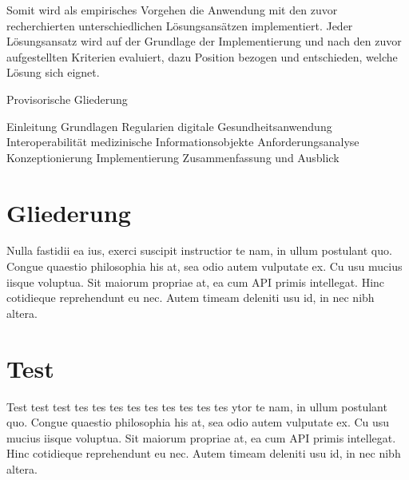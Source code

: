 Somit wird als empirisches Vorgehen die Anwendung mit den zuvor recherchierten unterschiedlichen Lösungsansätzen implementiert. Jeder Lösungsansatz wird auf der Grundlage der Implementierung und nach den zuvor aufgestellten Kriterien evaluiert, dazu Position bezogen und entschieden, welche Lösung sich eignet.

Provisorische Gliederung 

Einleitung 
Grundlagen
Regularien 
digitale Gesundheitsanwendung
Interoperabilität
medizinische Informationsobjekte 
Anforderungsanalyse
Konzeptionierung 
Implementierung
Zusammenfassung und Ausblick
	

%
%
\section{Gliederung}
\label{sec:intro:structure}
Nulla fastidii ea ius, exerci suscipit instructior te nam, in ullum postulant quo. Congue quaestio philosophia his at, sea odio autem vulputate ex. Cu usu mucius iisque voluptua. Sit maiorum propriae at, ea cum \ac{API} primis intellegat. Hinc cotidieque reprehendunt eu nec. Autem timeam deleniti usu id, in nec nibh altera.

%
%
\section{Test}
\label{sec:intro:structure}
Test test test tes tes tes tes tes tes tes tes tes ytor te nam, in ullum postulant quo. Congue quaestio philosophia his at, sea odio autem vulputate ex. Cu usu mucius iisque voluptua. Sit maiorum propriae at, ea cum \ac{API} primis intellegat. Hinc cotidieque reprehendunt eu nec. Autem timeam deleniti usu id, in nec nibh altera.
